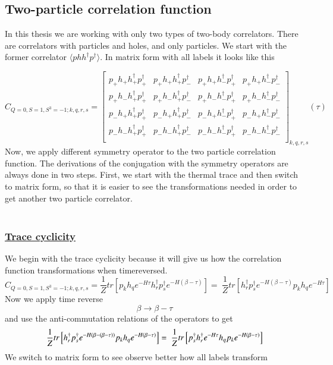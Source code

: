 \subsection{Two-particle correlation function}
\label{ssec:sym-twobody}
In this thesis we are working with only two types of two-body correlators. There are correlators with particles and holes, and only particles. We start with the former correlator $\langle phh^\dagger p^\dagger\rangle$. In matrix form with all labels it looks like this

\newcommand{\cor}[4]{p_{#1}h_{#2}h^\dagger_{#3}p^\dagger_{#4}}
\begin{equation}
  C_{Q=0,S=1,S^3=-1;k,q,r,s} =
  \left[
  \begin{array}{cccc}
    \cor{+}{+}{+}{+} & \cor{+}{+}{+}{-} & \cor{+}{+}{-}{+} & \cor{+}{+}{-}{-} \\
    \cor{+}{-}{+}{+} & \cor{+}{-}{+}{-} & \cor{+}{-}{-}{+} & \cor{+}{-}{-}{-} \\
    \cor{-}{+}{+}{+} & \cor{-}{+}{+}{-} & \cor{-}{+}{-}{+} & \cor{-}{+}{-}{-} \\
    \cor{-}{-}{+}{+} & \cor{-}{-}{+}{-} & \cor{-}{-}{-}{+} & \cor{-}{-}{-}{-} \\
  \end{array}
  \right]_{k,q,r,s} (\tau)
\end{equation}
Now, we apply different symmetry operator to the two particle correlation function. The derivations of the conjugation with the symmetry operators are always done in two steps. First, we start with the thermal trace and then switch to matrix form, so that it is easier to see the transformations needed in order to get another two particle correlator.
\\
\\
\subsubsection{\underline{Trace cyclicity}}
We begin with the trace cyclicity because it will give us how the correlation function transformations when timereversed.
\\
\begin{equation}
  C_{Q=0,S=1,S^3=-1;k,q,r,s} = \frac{1}{Z}tr\left[p_kh_qe^{-H\tau}h^\dagger_rp^\dagger_se^{-H\left(\beta-\tau\right)}\right] =\
  \frac{1}{Z}tr\left[h^\dagger_rp^\dagger_se^{-H\left(\beta-\tau\right)}p_kh_qe^{-H\tau}\right]
\end{equation}
Now we apply time reverse
$$\beta \rightarrow \beta - \tau$$
and use the anti-commutation relations of the operators to get
\begin{equation}
  \frac{1}{Z}tr\left[h^\dagger_rp^\dagger_se^{-H\left(\beta-\left(\beta-\tau\right)\right)}p_kh_qe^{-H\left(\beta-\tau\right)}\right]=\\\
  \frac{1}{Z}tr\left[p^\dagger_sh^\dagger_re^{-H\tau}h_qp_ke^{-H\left(\beta-\tau\right)}\right]
\end{equation}
We switch to matrix form to see observe better how all labels transform

